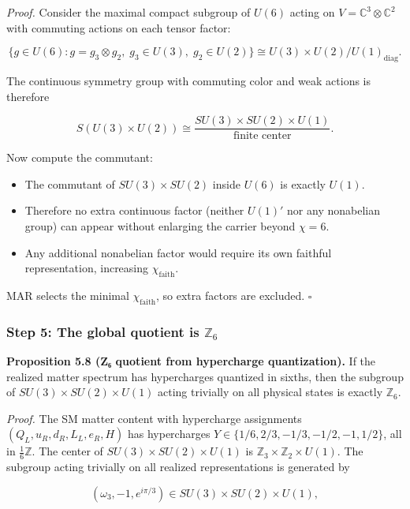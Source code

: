 \emph{Proof.} Consider the maximal compact subgroup of \(U(6)\) acting on \(V = \mathbb{C}^3 \otimes \mathbb{C}^2\) with commuting actions on each tensor factor:

\[\{g \in U(6) : g = g_3 \otimes g_2,\; g_3 \in U(3),\; g_2 \in U(2)\} \cong U(3) \times U(2) / U(1)_{\mathrm{diag}}.\]

The continuous symmetry group with commuting color and weak actions is therefore

\[S(U(3) \times U(2)) \cong \frac{SU(3) \times SU(2) \times U(1)}{\text{finite center}}.\]

Now compute the commutant:

\begin{itemize}
\tightlist
\item
  The commutant of \(SU(3) \times SU(2)\) inside \(U(6)\) is exactly \(U(1)\).
\item
  Therefore no extra continuous factor (neither \(U(1)'\) nor any nonabelian group) can appear without enlarging the carrier beyond \(\chi = 6\).
\item
  Any additional nonabelian factor would require its own faithful representation, increasing \(\chi_{\mathrm{faith}}\).
\end{itemize}

MAR selects the minimal \(\chi_{\mathrm{faith}}\), so extra factors are excluded. \(\square\)

\subsubsection{\texorpdfstring{Step 5: The global quotient is \(\mathbb{Z}_6\)}{Step 5: The global quotient is \textbackslash mathbb\{Z\}\_6}}\label{step-5-the-global-quotient-is-mathbbz_6}

\textbf{Proposition 5.8 (Z₆ quotient from hypercharge quantization).} If the realized matter spectrum has hypercharges quantized in sixths, then the subgroup of \(SU(3) \times SU(2) \times U(1)\) acting trivially on all physical states is exactly \(\mathbb{Z}_6\).

\emph{Proof.} The SM matter content with hypercharge assignments \((Q_L, u_R, d_R, L_L, e_R, H)\) has hypercharges \(Y \in \{1/6, 2/3, -1/3, -1/2, -1, 1/2\}\), all in \(\frac{1}{6}\mathbb{Z}\). The center of \(SU(3) \times SU(2) \times U(1)\) is \(\mathbb{Z}_3 \times \mathbb{Z}_2 \times U(1)\). The subgroup acting trivially on all realized representations is generated by

\[(\omega_3, -1, e^{i\pi/3}) \in SU(3) \times SU(2) \times U(1),\]

